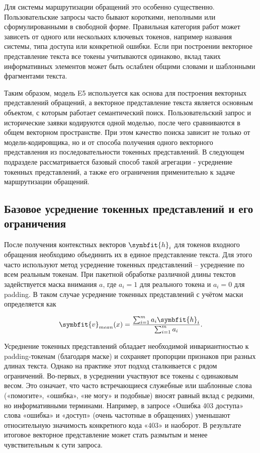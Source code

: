 \documentclass[14pt,a4paper]{extarticle}
\numberwithin{figure}{section}
\numberwithin{table}{section}
\begin{document}
Для системы маршрутизации обращений это особенно существенно.
Пользовательские запросы часто бывают короткими, неполными или
сформулированными в свободной форме. Правильная категория работ может
зависеть от одного или нескольких ключевых токенов, например названия
системы, типа доступа или конкретной ошибки. Если при построении
векторное представление текста все токены учитываются одинаково, вклад таких
информативных элементов может быть ослаблен общими словами и шаблонными
фрагментами текста.

Таким образом, модель E5 используется как основа для построения
векторных представлений обращений, а векторное представление текста является
основным объектом, с которым работает семантический поиск.
Пользовательский запрос и исторические заявки кодируются одной моделью,
после чего сравниваются в общем векторном пространстве. При этом
качество поиска зависит не только от модели-кодировщика, но и от способа
получения одного векторного представления из последовательности токенных
представлений. В следующем подразделе рассматривается базовый способ
такой агрегации - усреднение токенных представлений, а также его ограничения применительно к
задаче маршрутизации обращений.

\subsection{Базовое усреднение токенных представлений и его
ограничения}

После получения контекстных векторов \(\symbfit{h}_i\) для токенов входного обращения
необходимо объединить их в единое представление текста. Для этого часто
используют метод усреднение токенных представлений -- усреднение по всем реальным токенам.
При пакетной обработке различной длины текстов задействуется маска
внимания \(a\), где \(a_i=1\) для реального токена и \(a_i=0\) для padding. В
таком случае усреднение токенных представлений с учётом маски определяется как

\begin{equation}\symbfit{v}_{mean}(x)=\frac{\sum_{i=1}^{m} a_i\symbfit{h}_i}{\sum_{i=1}^{m}a_i}.\label{eq:mean-pooling}\end{equation}

Усреднение токенных представлений обладает необходимой инвариантностью к padding-токенам
(благодаря маске) и сохраняет пропорции признаков при разных длинах
текста. Однако на практике этот подход сталкивается с рядом ограничений.
Во-первых, в усреднении участвуют все токены с одинаковым весом. Это
означает, что часто встречающиеся служебные или шаблонные слова
(«помогите», «ошибка», «не могу» и подобные) вносят равный вклад с
редкими, но информативными терминами. Например, в запросе «Ошибка 403
доступа» слова «ошибка» и «доступ» (очень частотные в обращениях)
уменьшают относительную значимость конкретного кода «403» и наоборот. В
результате итоговое векторное представление может стать размытым и менее
чувствительным к сути запроса.
\end{document}
